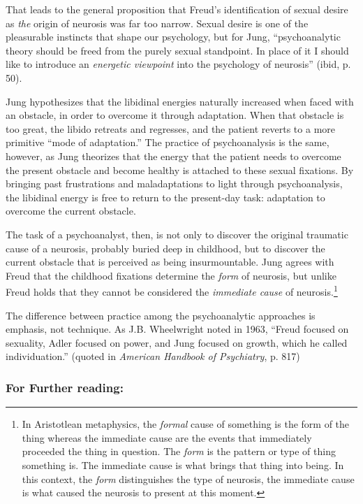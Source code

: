 \begin{refsection}
That leads to the general proposition that Freud's identification of sexual desire as \emph{the} origin of neurosis was far too narrow. Sexual desire is one of the pleasurable instincts that shape our psychology, but for Jung, ``psychoanalytic theory should be freed from the purely sexual standpoint. In place of it I should like to introduce an \emph{energetic viewpoint} into the psychology of neurosis'' (ibid, p. 50).

Jung hypothesizes that the libidinal energies naturally increased when faced with an obstacle, in order to overcome it through adaptation. When that obstacle is too great, the libido retreats and regresses, and the patient reverts to a more primitive ``mode of adaptation.'' The practice of psychoanalysis is the same, however, as Jung theorizes that the energy that the patient needs to overcome the present obstacle and become healthy is attached to these sexual fixations. By bringing past frustrations and maladaptations to light through psychoanalysis, the libidinal energy is free to return to the present-day task: adaptation to overcome the current obstacle.

The task of a psychoanalyst, then, is not only to discover the original traumatic cause of a neurosis, probably buried deep in childhood, but to discover the current obstacle that is perceived as being insurmountable. Jung agrees with Freud that the childhood fixations determine the \emph{form} of neurosis, but unlike Freud holds that they cannot be considered the \emph{immediate cause} of neurosis.\footnote{In Aristotlean metaphysics, the \emph{formal} cause of something is the form of the thing whereas the immediate cause are the events that immediately proceeded the thing in question. The \emph{form} is the pattern or type of thing something is. The immediate cause is what brings that thing into being. In this context, the \emph{form} distinguishes the type of neurosis, the immediate cause is what caused the neurosis to present at this moment.}

The difference between practice among the psychoanalytic approaches is emphasis, not technique. As J.B. Wheelwright noted in 1963, ``Freud focused on sexuality, Adler focused on power, and Jung focused on growth, which he called individuation.'' (quoted in \emph{American Handbook of Psychiatry}, p. 817)

\subsubsection{For Further reading:}
\label{forfurtherreading:}


\end{refsection}
